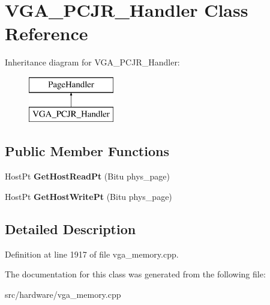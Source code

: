 \hypertarget{classVGA__PCJR__Handler}{\section{V\-G\-A\-\_\-\-P\-C\-J\-R\-\_\-\-Handler Class Reference}
\label{classVGA__PCJR__Handler}
}
Inheritance diagram for V\-G\-A\-\_\-\-P\-C\-J\-R\-\_\-\-Handler\-:\begin{figure}[H]
\begin{center}
\leavevmode
\includegraphics[height=2.000000cm]{classVGA__PCJR__Handler}
\end{center}
\end{figure}
\subsection*{Public Member Functions}
\begin{DoxyCompactItemize}
\item 
\hypertarget{classVGA__PCJR__Handler_a7af2542f4c4e96999dbda7fff177d521}{Host\-Pt {\bfseries Get\-Host\-Read\-Pt} (Bitu phys\-\_\-page)}\label{classVGA__PCJR__Handler_a7af2542f4c4e96999dbda7fff177d521}

\item 
\hypertarget{classVGA__PCJR__Handler_aed69d78cd3e5880a41aa82b1a99d93b3}{Host\-Pt {\bfseries Get\-Host\-Write\-Pt} (Bitu phys\-\_\-page)}\label{classVGA__PCJR__Handler_aed69d78cd3e5880a41aa82b1a99d93b3}

\end{DoxyCompactItemize}


\subsection{Detailed Description}


Definition at line 1917 of file vga\-\_\-memory.\-cpp.



The documentation for this class was generated from the following file\-:\begin{DoxyCompactItemize}
\item 
src/hardware/vga\-\_\-memory.\-cpp\end{DoxyCompactItemize}
